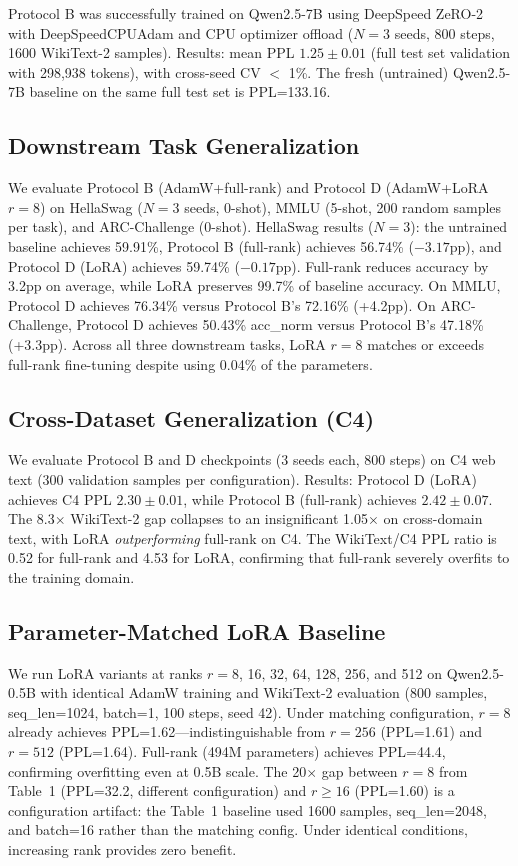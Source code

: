 \documentclass[11pt]{article}
\begin{document}
Protocol B was successfully trained on Qwen2.5-7B using DeepSpeed ZeRO-2 with DeepSpeedCPUAdam and CPU optimizer offload ($N=3$ seeds, 800 steps, 1600 WikiText-2 samples). Results: mean PPL $1.25 \pm 0.01$ (full test set validation with 298,938 tokens), with cross-seed CV $<$ 1\%. The fresh (untrained) Qwen2.5-7B baseline on the same full test set is PPL=133.16.

\subsection{Downstream Task Generalization}

We evaluate Protocol B (AdamW+full-rank) and Protocol D (AdamW+LoRA $r=8$) on HellaSwag ($N=3$ seeds, 0-shot), MMLU (5-shot, 200 random samples per task), and ARC-Challenge (0-shot). HellaSwag results ($N=3$): the untrained baseline achieves 59.91\%, Protocol B (full-rank) achieves 56.74\% ($-3.17$pp), and Protocol D (LoRA) achieves 59.74\% ($-0.17$pp). Full-rank reduces accuracy by 3.2pp on average, while LoRA preserves 99.7\% of baseline accuracy. On MMLU, Protocol D achieves 76.34\% versus Protocol B's 72.16\% (+4.2pp). On ARC-Challenge, Protocol D achieves 50.43\% acc\_norm versus Protocol B's 47.18\% (+3.3pp). Across all three downstream tasks, LoRA $r=8$ matches or exceeds full-rank fine-tuning despite using 0.04\% of the parameters.

\subsection{Cross-Dataset Generalization (C4)}

We evaluate Protocol B and D checkpoints (3 seeds each, 800 steps) on C4 web text (300 validation samples per configuration). Results: Protocol D (LoRA) achieves C4 PPL $2.30 \pm 0.01$, while Protocol B (full-rank) achieves $2.42 \pm 0.07$. The 8.3$\times$ WikiText-2 gap collapses to an insignificant 1.05$\times$ on cross-domain text, with LoRA \textit{outperforming} full-rank on C4. The WikiText/C4 PPL ratio is 0.52 for full-rank and 4.53 for LoRA, confirming that full-rank severely overfits to the training domain.

\subsection{Parameter-Matched LoRA Baseline}

We run LoRA variants at ranks $r=8$, 16, 32, 64, 128, 256, and 512 on Qwen2.5-0.5B with identical AdamW training and WikiText-2 evaluation (800 samples, seq\_len=1024, batch=1, 100 steps, seed 42). Under matching configuration, $r=8$ already achieves PPL=1.62---indistinguishable from $r=256$ (PPL=1.61) and $r=512$ (PPL=1.64). Full-rank (494M parameters) achieves PPL=44.4, confirming overfitting even at 0.5B scale. The 20$\times$ gap between $r=8$ from Table~1 (PPL=32.2, different configuration) and $r \geq 16$ (PPL=1.60) is a configuration artifact: the Table~1 baseline used 1600 samples, seq\_len=2048, and batch=16 rather than the matching config. Under identical conditions, increasing rank provides zero benefit.
\end{document}
